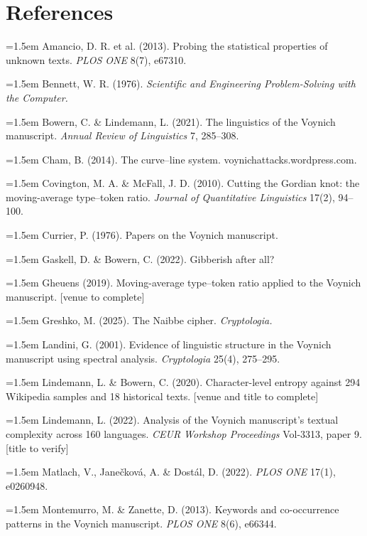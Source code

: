 \documentclass[11pt,a4paper]{article}
\begin{document}
\section*{References}

\noindent\hangindent=1.5em Amancio, D. R. et al. (2013). Probing the statistical properties of unknown texts. \emph{PLOS ONE} 8(7), e67310.\par
\noindent\hangindent=1.5em Bennett, W. R. (1976). \emph{Scientific and Engineering Problem-Solving with the Computer.}\par
\noindent\hangindent=1.5em Bowern, C. \& Lindemann, L. (2021). The linguistics of the Voynich manuscript. \emph{Annual Review of Linguistics} 7, 285--308.\par
\noindent\hangindent=1.5em Cham, B. (2014). The curve--line system. voynichattacks.wordpress.com.\par
\noindent\hangindent=1.5em Covington, M. A. \& McFall, J. D. (2010). Cutting the Gordian knot: the moving-average type--token ratio. \emph{Journal of Quantitative Linguistics} 17(2), 94--100.\par
\noindent\hangindent=1.5em Currier, P. (1976). Papers on the Voynich manuscript.\par
\noindent\hangindent=1.5em Gaskell, D. \& Bowern, C. (2022). Gibberish after all?\par
\noindent\hangindent=1.5em Gheuens (2019). Moving-average type--token ratio applied to the Voynich manuscript. [venue to complete]\par
\noindent\hangindent=1.5em Greshko, M. (2025). The Naibbe cipher. \emph{Cryptologia.}\par
\noindent\hangindent=1.5em Landini, G. (2001). Evidence of linguistic structure in the Voynich manuscript using spectral analysis. \emph{Cryptologia} 25(4), 275--295.\par
\noindent\hangindent=1.5em Lindemann, L. \& Bowern, C. (2020). Character-level entropy against 294 Wikipedia samples and 18 historical texts. [venue and title to complete]\par
\noindent\hangindent=1.5em Lindemann, L. (2022). Analysis of the Voynich manuscript's textual complexity across 160 languages. \emph{CEUR Workshop Proceedings} Vol-3313, paper 9. [title to verify]\par
\noindent\hangindent=1.5em Matlach, V., Janečková, A. \& Dostál, D. (2022). \emph{PLOS ONE} 17(1), e0260948.\par
\noindent\hangindent=1.5em Montemurro, M. \& Zanette, D. (2013). Keywords and co-occurrence patterns in the Voynich manuscript. \emph{PLOS ONE} 8(6), e66344.\par
\end{document}
